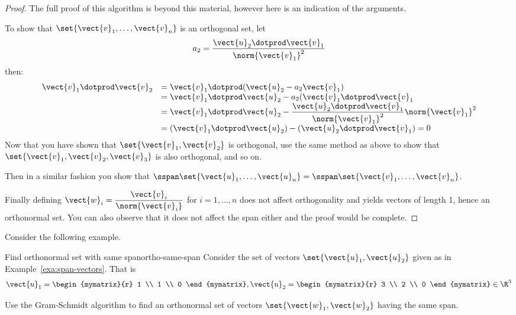 \begin{proof}
The full proof of this algorithm is beyond this material, however here is an indication of the arguments.

To show that  $\set{\vect{v}_1,\ldots, \vect{v}_n  } $ is an orthogonal set, let
\[ a_2 =  \dfrac{ \vect{u}_2 \dotprod \vect{v}_1}{\norm{\vect{v}_1}^2} \]
then:
\[
\begin{array}{ll}
 \vect{v}_1 \dotprod \vect{v}_2 &  =  \vect{v}_1 \dotprod (\vect{u}_2 - a_2 \vect{v}_1)  \\
 & = \vect{v}_1 \dotprod \vect{u}_2 - a_2 (\vect{v}_1 \dotprod \vect{v}_1  \\
 & = \vect{v}_1 \dotprod \vect{u}_2 - \dfrac{ \vect{u}_2 \dotprod \vect{v}_1}{\norm{\vect{v}_1}^2} \norm{\vect{v}_1}^2 \\
 & = ( \vect{v}_1 \dotprod \vect{u}_2 ) - ( \vect{u}_2 \dotprod \vect{v}_1 ) =0\\
\end{array}
\]
Now that you have shown that $\set{\vect{v}_1, \vect{v}_2}$ is orthogonal,  use the same method as above to show that
$\set{\vect{v}_1, \vect{v}_2, \vect{v}_3}$ is also orthogonal,  and so on.

Then in a similar fashion you show that $\sspan\set{
\vect{u}_1,\ldots,\vect{u}_n } = \sspan\set{
\vect{v}_1,\ldots,\vect{v}_n }$.

Finally defining $\vect{w}_i =
\dfrac{\vect{v}_i}{\norm{\vect{v}_i}}$ for $i=1,\ldots,n$ does not affect orthogonality and yields vectors of length 1,
hence an orthonormal set. You can also observe that it does not affect
the span either and the proof would be complete.
\end{proof}

Consider the following example.

\begin{example}{Find orthonormal set with same span}{ortho-same-span}
Consider the set of vectors $\set{\vect{u}_1, \vect{u}_2}$ given as in Example~\ref{exa:span-vectors}. That is
\[
\vect{u}_1=\begin{mymatrix}{r}
1 \\
1 \\
0
\end{mymatrix}, \vect{u}_2=\begin{mymatrix}{r}
3 \\
2 \\
0
\end{mymatrix} \in \R^{3}
\]

Use the Gram-Schmidt algorithm to find an orthonormal set of vectors $\set{\vect{w}_1, \vect{w}_2}$ having the same span.
\end{example}

